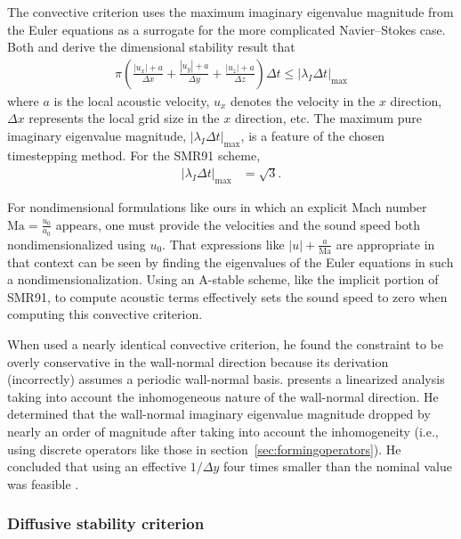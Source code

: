 \documentclass[letterpaper,11pt,nointlimits,reqno,draft]{amsart}
\begin{document}
The convective criterion uses the maximum imaginary eigenvalue magnitude from
the Euler equations as a surrogate for the more complicated Navier--Stokes
case.  Both \citet[equation~2.39]{Kwok2002} and
\citet[equations~4.20--21]{Guarini1998} derive the dimensional stability result
that
\begin{align}\label{eq:convectivestability}
  \pi\left(
      \frac{\left|u_{x}\right| + a}{\Delta{}x}
    + \frac{\left|u_{y}\right| + a}{\Delta{}y}
    + \frac{\left|u_{z}\right| + a}{\Delta{}z}
  \right) \Delta{}t \leq \left|\lambda_{I}\Delta{}t\right|_{\mbox{max}}
\end{align}
where $a$ is the local acoustic velocity, $u_{x}$ denotes the velocity in the $x$
direction, $\Delta{}x$ represents the local grid size in the $x$ direction, etc.
The maximum pure imaginary eigenvalue magnitude,
$\left|\lambda_{I}\Delta{}t\right|_{\mbox{max}}$, is a feature of the chosen
timestepping method.  For the SMR91 scheme,
\begin{align}
  \left|\lambda_{I}\Delta{}t\right|_{\mbox{max}} &= \sqrt{3}.
\end{align}

For nondimensional formulations like ours in which an explicit Mach number
$\mbox{Ma}=\frac{u_0}{a_0}$ appears, one must provide the velocities and the
sound speed both nondimensionalized using $u_0$.  That expressions like
$\left|u\right| + \frac{a}{\mbox{Ma}}$ are appropriate in that context can be
seen by finding the eigenvalues of the Euler equations in such a
nondimensionalization.  Using an A-stable scheme, like the implicit portion of
SMR91, to compute acoustic terms effectively sets the sound speed to zero when
computing this convective criterion.

When \citeauthor{Venugopal2003} used a nearly identical convective criterion,
he found the constraint to be overly conservative in the wall-normal direction
because its derivation (incorrectly) assumes a periodic wall-normal basis.
\citet[\textsection{}3.2]{Venugopal2003} presents a linearized analysis taking
into account the inhomogeneous nature of the wall-normal direction.  He
determined that the wall-normal imaginary eigenvalue magnitude dropped by
nearly an order of magnitude after taking into account the inhomogeneity (i.e.,
using discrete operators like those in section~\ref{sec:formingoperators}).  He
concluded that using an effective $1/\Delta{}y$ four times smaller than the
nominal value was feasible \citep[equation~3.29]{Venugopal2003}.

\subsubsection{Diffusive stability criterion}
\label{sec:diffusivestability}
\end{document}
